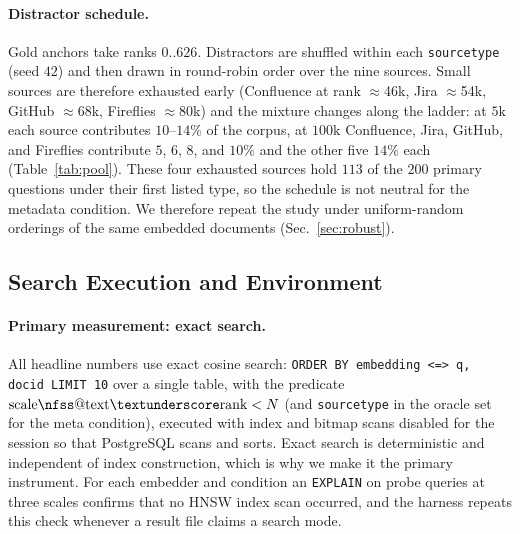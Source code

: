 \documentclass{ieeeaccess}
\makeatletter
\DeclareRobustCommand{\_}{\ifmmode\nfss@text{\textunderscore}\else\textunderscore\allowbreak\fi}
\makeatother
\begin{document}
\paragraph{Distractor schedule.}
Gold anchors take ranks $0..626$. Distractors are shuffled within each \texttt{source\_type} (seed $42$) and then drawn in round-robin order over the nine sources. Small sources are therefore exhausted early (Confluence at rank $\approx$46k, Jira $\approx$54k, GitHub $\approx$68k, Fireflies $\approx$80k) and the mixture changes along the ladder: at $5\text{k}$ each source contributes $10$--$14\%$ of the corpus, at $100\text{k}$ Confluence, Jira, GitHub, and Fireflies contribute $5$, $6$, $8$, and $10\%$ and the other five $14\%$ each (Table~\ref{tab:pool}). These four exhausted sources hold $113$ of the $200$ primary questions under their first listed type, so the schedule is not neutral for the metadata condition. We therefore repeat the study under uniform-random orderings of the same embedded documents (Sec.~\ref{sec:robust}).



\subsection{Search Execution and Environment}
\label{sec:exec}
\paragraph{Primary measurement: exact search.}
All headline numbers use exact cosine search: \texttt{ORDER BY embedding <=> q, doc\_id LIMIT 10} over a single table, with the predicate $\mathrm{scale\_rank}<N$ (and \texttt{source\_type} in the oracle set for the meta condition), executed with index and bitmap scans disabled for the session so that PostgreSQL scans and sorts. Exact search is deterministic and independent of index construction, which is why we make it the primary instrument. For each embedder and condition an \texttt{EXPLAIN} on probe queries at three scales confirms that no HNSW index scan occurred, and the harness repeats this check whenever a result file claims a search mode.
\end{document}
